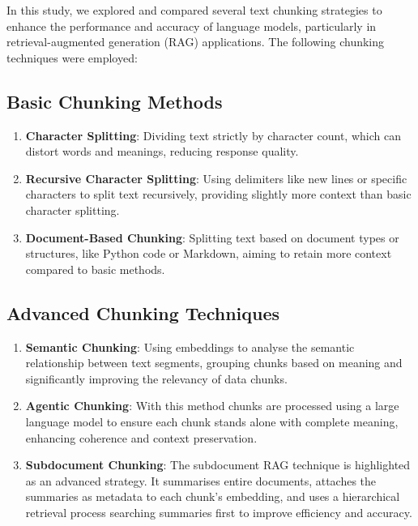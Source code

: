 \documentclass[
  letterpaper,
  DIV=11,
  numbers=noendperiod]{scrartcl}
\begin{document}
In this study, we explored and compared several text chunking strategies
to enhance the performance and accuracy of language models, particularly
in retrieval-augmented generation (RAG) applications. The following
chunking techniques were employed:

\subsection{Basic Chunking Methods}\label{basic-chunking-methods}

\begin{enumerate}
\def\labelenumi{\arabic{enumi}.}
\item
  \textbf{Character Splitting}: Dividing text strictly by character
  count, which can distort words and meanings, reducing response
  quality.
\item
  \textbf{Recursive Character Splitting}: Using delimiters like new
  lines or specific characters to split text recursively, providing
  slightly more context than basic character splitting.
\item
  \textbf{Document-Based Chunking}: Splitting text based on document
  types or structures, like Python code or Markdown, aiming to retain
  more context compared to basic methods.
\end{enumerate}

\subsection{Advanced Chunking
Techniques}\label{advanced-chunking-techniques}

\begin{enumerate}
\def\labelenumi{\arabic{enumi}.}
\setcounter{enumi}{3}
\item
  \textbf{Semantic Chunking}: Using embeddings to analyse the semantic
  relationship between text segments, grouping chunks based on meaning
  and significantly improving the relevancy of data chunks.
\item
  \textbf{Agentic Chunking}: With this method chunks are processed using
  a large language model to ensure each chunk stands alone with complete
  meaning, enhancing coherence and context preservation.
\item
  \textbf{Subdocument Chunking}: The subdocument RAG technique is
  highlighted as an advanced strategy. It summarises entire documents,
  attaches the summaries as metadata to each chunk's embedding, and uses
  a hierarchical retrieval process searching summaries first to improve
  efficiency and accuracy.
\end{enumerate}
\end{document}
